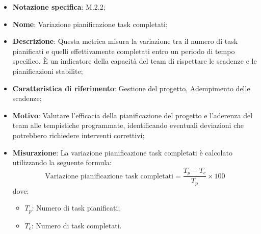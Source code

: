 \begin{itemize}
    \item \textbf{Notazione specifica}: M.2.2;
    \item \textbf{Nome}: Variazione pianificazione task completati;
    \item \textbf{Descrizione}: Questa metrica misura la variazione tra il numero di task pianificati e quelli effettivamente completati entro un periodo di tempo specifico. È un indicatore della capacità del team di rispettare le scadenze e le pianificazioni stabilite;
    \item \textbf{Caratteristica di riferimento}: Gestione del progetto, Adempimento delle scadenze;
    \item \textbf{Motivo}: Valutare l'efficacia della pianificazione del progetto e l'aderenza del team alle tempistiche programmate, identificando eventuali deviazioni che potrebbero richiedere interventi correttivi;
    \item \textbf{Misurazione}: La variazione pianificazione task completati è calcolato utilizzando la seguente formula:
    \[
        \text{Variazione pianificazione task completati} =\frac{T_p - T_c}{T_p} \times 100
    \]
    dove:
    \begin{itemize}
        \item $T_{p}$: Numero di task pianificati;
        \item $T_{c}$: Numero di task completati.
    \end{itemize}
    
\end{itemize}
